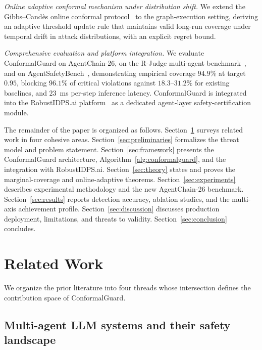 \documentclass[12pt,a4paper]{article}
\theoremstyle{definition}
\theoremstyle{remark}
\newcommand{\modelname}{ConformalGuard}
\newcommand{\benchname}{AgentChain-26}
\begin{document}
\textit{Online adaptive conformal mechanism under distribution shift.} We extend the Gibbs--Cand\`es online conformal protocol~\cite{gibbs2021adaptive} to the graph-execution setting, deriving an adaptive threshold update rule that maintains valid long-run coverage under temporal drift in attack distributions, with an explicit regret bound.

\textit{Comprehensive evaluation and platform integration.} We evaluate \modelname{} on \benchname{}, on the R-Judge multi-agent benchmark~\cite{yuan2024rjudge}, and on AgentSafetyBench~\cite{agentsafetybench2024}, demonstrating empirical coverage $94.9\%$ at target $0.95$, blocking $96.1\%$ of critical violations against $18.3$--$31.2\%$ for existing baselines, and $23$~ms per-step inference latency. \modelname{} is integrated into the RobustIDPS.ai platform~\cite{anaedevha2026robustidps} as a dedicated agent-layer safety-certification module.

The remainder of the paper is organized as follows. Section~\ref{sec:related} surveys related work in four cohesive areas. Section~\ref{sec:preliminaries} formalizes the threat model and problem statement. Section~\ref{sec:framework} presents the \modelname{} architecture, Algorithm~\ref{alg:conformalguard}, and the integration with RobustIDPS.ai. Section~\ref{sec:theory} states and proves the marginal-coverage and online-adaptive theorems. Section~\ref{sec:experiments} describes experimental methodology and the new \benchname{} benchmark. Section~\ref{sec:results} reports detection accuracy, ablation studies, and the multi-axis achievement profile. Section~\ref{sec:discussion} discusses production deployment, limitations, and threats to validity. Section~\ref{sec:conclusion} concludes.


\section{Related Work}
\label{sec:related}

We organize the prior literature into four threads whose intersection defines the contribution space of \modelname{}.

\subsection{Multi-agent LLM systems and their safety landscape}
\end{document}
